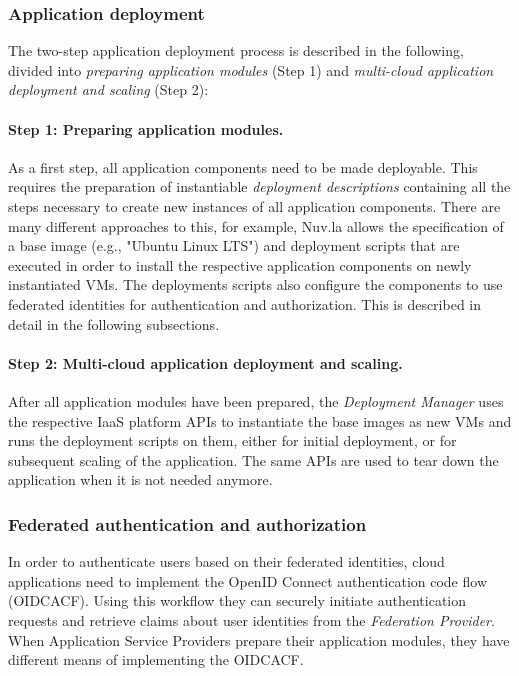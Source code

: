 \documentclass{llncs}
\begin{document}
\subsubsection{Application deployment}

The two-step application deployment process is described in the following, divided into \textit{preparing application modules} (Step 1) and \textit{multi-cloud application deployment and scaling} (Step 2):

\paragraph{Step 1: Preparing application modules.} As a first step, all application components need to be made deployable. This requires the preparation of instantiable \textit{deployment descriptions} containing all the steps necessary to create new instances of all application components. There are many different approaches to this, for example, Nuv.la allows the specification of a base image (e.g., "Ubuntu Linux LTS") and deployment scripts that are executed in order to install the respective application components on newly instantiated VMs. The deployments scripts also configure the components to use federated identities for authentication and authorization. This is described in detail in the following subsections.

\paragraph{Step 2: Multi-cloud application deployment and scaling.} After all application modules have been prepared, the \textit{Deployment Manager} uses the respective IaaS platform APIs to instantiate the base images as new VMs and runs the deployment scripts on them, either for initial deployment, or for subsequent scaling of the application. The same APIs are used to tear down the application when it is not needed anymore.

\subsubsection{Federated authentication and authorization}

In order to authenticate users based on their federated identities, cloud applications need to implement the OpenID Connect authentication code flow (OIDCACF). Using this workflow they can securely initiate authentication requests and retrieve claims about user identities from the \textit{Federation Provider}. When Application Service Providers prepare their application modules, they have different means of implementing the OIDCACF.
\end{document}
